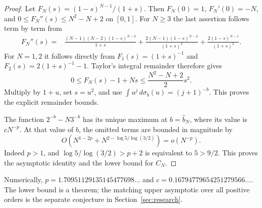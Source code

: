 \begin{proof}
Let $F_N(s)=(1-s)^{N-1}/(1+s)$. Then
$F_N(0)=1$, $F_N'(0)=-N$, and
$0\le F_N''(s)\le N^2-N+2$ on $[0,1]$.
For $N\ge3$ the last assertion follows term by term from
\begin{align*}
 F_N''(s)={}&
 \frac{(N-1)(N-2)(1-s)^{N-3}}{1+s}
 +\frac{2(N-1)(1-s)^{N-2}}{(1+s)^2}
 +\frac{2(1-s)^{N-1}}{(1+s)^3}.
\end{align*}
For $N=1,2$ it follows directly from
$F_1(s)=(1+s)^{-1}$ and $F_2(s)=2(1+s)^{-1}-1$.
Taylor's integral remainder therefore gives
\[
 0\le F_N(s)-1+Ns\le\frac{N^2-N+2}{2}s^2.
\]
Multiply by $1+u$, set $s=u^2$, and use
$\int u^j\,d\sigma_b(u)=(j+1)^{-b}$. This proves the explicit
remainder bounds.

The function $2^{-b}-N3^{-b}$ has its unique maximum at
$b=\widehat b_N$, where its value is $cN^{-p}$. At that value of $b$,
the omitted terms are bounded in magnitude by
\[
 O\!\left(N^{1-2p}
       +N^{2-\log5/\log(3/2)}\right)=o(N^{-p}).
\]
Indeed $p>1$, and
$\log5/\log(3/2)>p+2$ is equivalent to $5>9/2$.
This proves the asymptotic identity and the lower bound for $C_N$.
\end{proof}


Numerically, $p=1.70951129135145477698\ldots$ and
$c=0.16794779654251279566\ldots$. The lower bound is a theorem;
the matching upper asymptotic over all positive orders is
the separate conjecture in Section~\ref{sec:research}.
